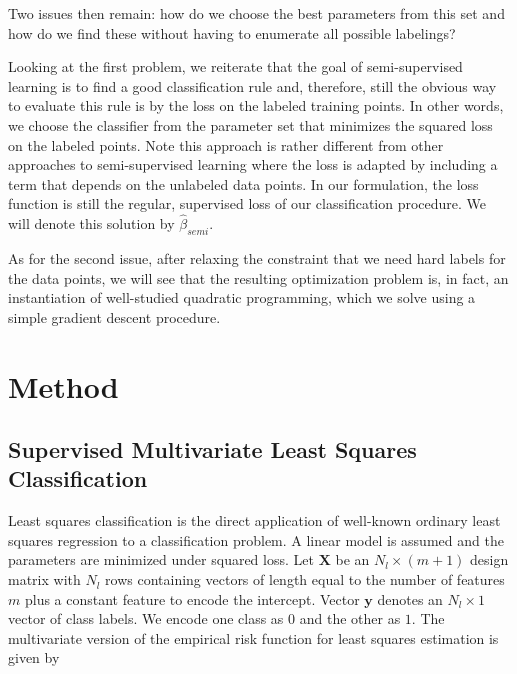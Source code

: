 \documentclass{elsarticle}
\begin{document}
Two issues then remain: how do we choose the best parameters from this set and how do we find these without having to enumerate all possible labelings?

Looking at the first problem, we reiterate that the goal of semi-supervised learning is to find a good classification rule and, therefore, still the obvious way to evaluate this rule is by the loss on the labeled training points. In other words, we choose the classifier from the parameter set that minimizes the squared loss on the labeled points. Note this approach is rather different from other approaches to semi-supervised learning where the loss is adapted by including a term that depends on the unlabeled data points. In our formulation, the loss function is still the regular, supervised loss of our classification procedure. We will denote this solution by $\hat{\beta}_{semi}$.

As for the second issue, after relaxing the constraint that we need hard labels for the data points, we will see that the resulting optimization problem is, in fact, an instantiation of well-studied quadratic programming, which we solve using a simple gradient descent procedure.

\section{Method}
\label{section:method}

\subsection{Supervised Multivariate Least Squares Classification} \label{section:leastsquares}

Least squares classification \cite{Hastie2001,Rifkin2003} is the direct application of well-known ordinary least squares regression to a classification problem. A linear model is assumed and the parameters are minimized under squared loss. Let $\mathbf{X}$ be an $N_l \times (m+1)$ design matrix with $N_l$ rows containing vectors of length equal to the number of features $m$ plus a constant feature to encode the intercept. Vector $\textbf{y}$ denotes an $N_l \times 1$ vector of  class labels. We encode one class as $0$ and the other as $1$.  The multivariate version of the empirical risk function for least squares estimation is given by
\end{document}

